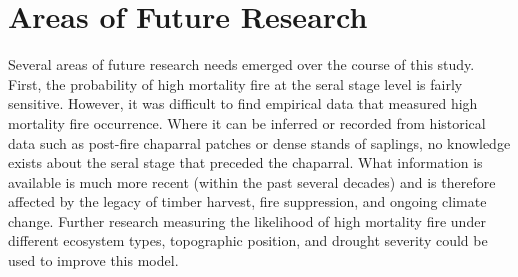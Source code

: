 








\section{Areas of Future Research}
Several areas of future research needs emerged over the course of this study. First, the probability of high mortality fire at the seral stage level is fairly sensitive. However, it was difficult to find empirical data that measured high mortality fire occurrence. Where it can be inferred or recorded from historical data such as post-fire chaparral patches or dense stands of saplings, no knowledge exists about the seral stage that preceded the chaparral. What information is available is much more recent (within the past several decades) and is therefore affected by the legacy of timber harvest, fire suppression, and ongoing climate change. Further research measuring the likelihood of high mortality fire under different ecosystem types, topographic position, and drought severity could be used to improve this model.


